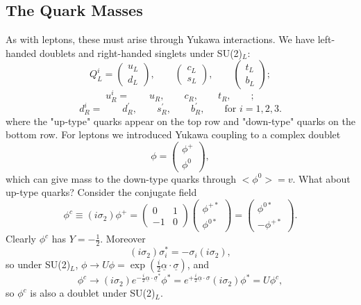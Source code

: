 \subsection{The Quark Masses}
%
As with leptons, these must arise through Yukawa interactions. We have left-handed doublets and right-handed singlets under SU(2)$_L$:
\[ Q_L^i = \left( \begin{array}{cc}
u_L   \\
d_L  \end{array} \right), \qquad
\left( \begin{array}{cc}
c_L   \\
s_L   \end{array} \right), \qquad
\left( \begin{array}{cc}
t_L   \\
b_L   \end{array} \right);\]
\[ 
u_R^i = \qquad u_R, \qquad c_R, \qquad t_R, \qquad;
\]
\[ 
d_R^i = \qquad d^\prime_R, \qquad s^\prime_R, \qquad b_R^\prime, \qquad \text{for } i=1,2,3.
\]
where the "up-type" quarks appear on the top row and "down-type" quarks on the bottom row. For leptons we introduced Yukawa coupling to a complex doublet
\[\phi = \left( \begin{array}{cc}
\phi^+ \\
\phi^0 \end{array} \right),
\]
which can give mass to the down-type quarks through $<\phi^0> = v$. What about up-type quarks? Consider the conjugate field
\[
\phi^c \equiv (i\sigma_2)\phi^+ = \left( \begin{array}{cc}
0 & 1   \\
-1 & 0  \end{array} \right) 
\left( \begin{array}{cc}
\phi^{+ *}   \\
\phi^{0 *}  \end{array} \right) = 
\left( \begin{array}{cc}
\phi^{0 *}   \\
-\phi^{+ *}  \end{array} \right).
\]
Clearly $\phi^c$ has $Y = - \frac{1}{2}$. Moreover
\begin{equation}
(i\sigma_2)\sigma_i^* = -\sigma_i(i\sigma_2),
\end{equation}
so under SU(2)$_L$, $\phi \to U \phi = \exp(\frac{i}{2}\underline{\alpha}\cdot \underline{\sigma})$, and
\begin{equation}
\phi^c \to (i\sigma_2)e^{-\frac{i}{2}\underline{\alpha}\cdot\underline{\sigma}^*} \phi^* = e^{+\frac{i}{2}\underline{\alpha}\cdot{\sigma}}(i\sigma_2)\phi^* = U \phi^c,
\end{equation}
so $\phi^c$ is also a doublet under SU(2)$_L$.

